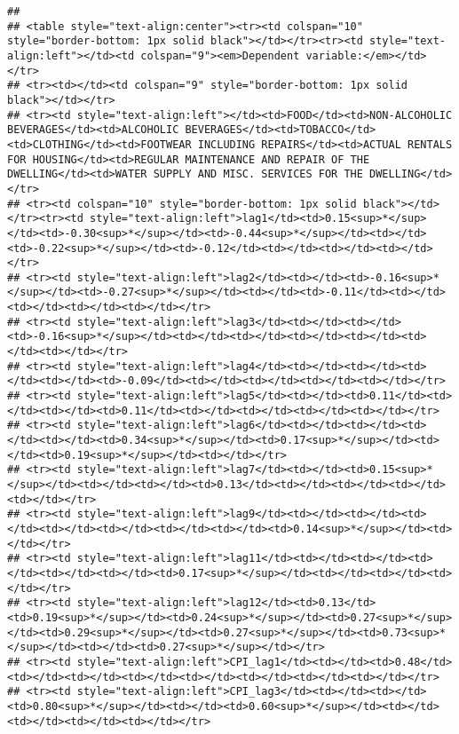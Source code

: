 \documentclass[
]{article}
\begin{document}
\begin{verbatim}
## 
## <table style="text-align:center"><tr><td colspan="10" style="border-bottom: 1px solid black"></td></tr><tr><td style="text-align:left"></td><td colspan="9"><em>Dependent variable:</em></td></tr>
## <tr><td></td><td colspan="9" style="border-bottom: 1px solid black"></td></tr>
## <tr><td style="text-align:left"></td><td>FOOD</td><td>NON-ALCOHOLIC BEVERAGES</td><td>ALCOHOLIC BEVERAGES</td><td>TOBACCO</td><td>CLOTHING</td><td>FOOTWEAR INCLUDING REPAIRS</td><td>ACTUAL RENTALS FOR HOUSING</td><td>REGULAR MAINTENANCE AND REPAIR OF THE DWELLING</td><td>WATER SUPPLY AND MISC. SERVICES FOR THE DWELLING</td></tr>
## <tr><td colspan="10" style="border-bottom: 1px solid black"></td></tr><tr><td style="text-align:left">lag1</td><td>0.15<sup>*</sup></td><td>-0.30<sup>*</sup></td><td>-0.44<sup>*</sup></td><td></td><td>-0.22<sup>*</sup></td><td>-0.12</td><td></td><td></td><td></td></tr>
## <tr><td style="text-align:left">lag2</td><td></td><td>-0.16<sup>*</sup></td><td>-0.27<sup>*</sup></td><td></td><td>-0.11</td><td></td><td></td><td></td><td></td></tr>
## <tr><td style="text-align:left">lag3</td><td></td><td></td><td>-0.16<sup>*</sup></td><td></td><td></td><td></td><td></td><td></td><td></td></tr>
## <tr><td style="text-align:left">lag4</td><td></td><td></td><td></td><td></td><td>-0.09</td><td></td><td></td><td></td><td></td></tr>
## <tr><td style="text-align:left">lag5</td><td></td><td>0.11</td><td></td><td></td><td>0.11</td><td></td><td></td><td></td><td></td></tr>
## <tr><td style="text-align:left">lag6</td><td></td><td></td><td></td><td></td><td>0.34<sup>*</sup></td><td>0.17<sup>*</sup></td><td></td><td>0.19<sup>*</sup></td><td></td></tr>
## <tr><td style="text-align:left">lag7</td><td></td><td>0.15<sup>*</sup></td><td></td><td></td><td>0.13</td><td></td><td></td><td></td><td></td></tr>
## <tr><td style="text-align:left">lag9</td><td></td><td></td><td></td><td></td><td></td><td></td><td></td><td>0.14<sup>*</sup></td><td></td></tr>
## <tr><td style="text-align:left">lag11</td><td></td><td></td><td></td><td></td><td></td><td>0.17<sup>*</sup></td><td></td><td></td><td></td></tr>
## <tr><td style="text-align:left">lag12</td><td>0.13</td><td>0.19<sup>*</sup></td><td>0.24<sup>*</sup></td><td>0.27<sup>*</sup></td><td>0.29<sup>*</sup></td><td>0.27<sup>*</sup></td><td>0.73<sup>*</sup></td><td></td><td>0.27<sup>*</sup></td></tr>
## <tr><td style="text-align:left">CPI_lag1</td><td></td><td>0.48</td><td></td><td></td><td></td><td></td><td></td><td></td><td></td></tr>
## <tr><td style="text-align:left">CPI_lag3</td><td></td><td></td><td>0.80<sup>*</sup></td><td></td><td>0.60<sup>*</sup></td><td></td><td></td><td></td><td></td></tr>

\end{verbatim}
\end{document}
